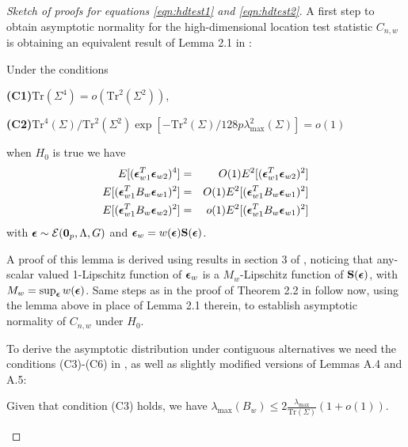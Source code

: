 \begin{proof}[Sketch of proofs for equations \ref{eqn:hdtest1} and \ref{eqn:hdtest2}]

A first step to obtain asymptotic normality for the high-dimensional location test statistic $C_{n,w}$ is obtaining an equivalent result of Lemma 2.1 in \cite{WangPengLi15}:

\begin{Lemma}\label{Lemma:HDlemma21} Under the conditions

\noindent\textbf{(C1)}$\text{Tr}(\Sigma^4) = o(\text{Tr}^2(\Sigma^2)) $,

\noindent\textbf{(C2)}$\text{Tr}^4(\Sigma) / \text{Tr}^2(\Sigma^2) \exp[ - \text{Tr}^2(\Sigma) / 128p \lambda^2_{\max}(\Sigma) ] = o(1)$
\vspace{1em}

\noindent when $H_0$ is true we have
%
\begin{eqnarray}
E[ ({\boldsymbol{\epsilon}}_{w1}^T {\boldsymbol{\epsilon}}_{w2})^4 ] &=& O(1) E^2[ ({\boldsymbol{\epsilon}}_{w1}^T {\boldsymbol{\epsilon}}_{w2})^2 ]\\
E[ ({\boldsymbol{\epsilon}}_{w1}^T B_w {\boldsymbol{\epsilon}}_{w1})^2 ] &=& O(1) E^2[ ({\boldsymbol{\epsilon}}_{w1}^T B_w {\boldsymbol{\epsilon}}_{w1})^2 ]\\
E[ ({\boldsymbol{\epsilon}}_{w1}^T B_w {\boldsymbol{\epsilon}}_{w2})^2 ] &=& o(1) E^2[ ({\boldsymbol{\epsilon}}_{w1}^T B_w {\boldsymbol{\epsilon}}_{w1})^2 ]
\end{eqnarray}
%
with ${\boldsymbol{\epsilon}} \sim \mathcal E({\bf 0}_p, \Lambda, G)$ and ${\boldsymbol{\epsilon}}_w = w({\boldsymbol{\epsilon}}) {\mathbf{S}}({\boldsymbol{\epsilon}})$.
\end{Lemma}
%
A proof of this lemma is derived using results in section 3 of \cite{ElKaroui09}, noticing that any-scalar valued 1-Lipschitz function of ${\boldsymbol{\epsilon}}_w$ is a $M_w$-Lipschitz function of ${\mathbf{S}}({\boldsymbol{\epsilon}})$, with $M_w = \sup_{\boldsymbol{\epsilon}} w({\boldsymbol{\epsilon}})$. Same steps as in the proof of Theorem 2.2 in \cite{WangPengLi15} follow now, using the lemma above in place of Lemma 2.1 therein, to establish asymptotic normality of $C_{n,w}$ under $H_0$.

To derive the asymptotic distribution under contiguous alternatives we need the conditions (C3)-(C6) in \cite{WangPengLi15}, as well as slightly modified versions of Lemmas A.4 and A.5:

\begin{Lemma}
Given that condition (C3) holds, we have $\lambda_{\max} (B_w) \leq 2 \frac{\lambda_{\max}}{\text{Tr} (\Sigma)} (1+o(1))$.
\end{Lemma}


\end{proof}
